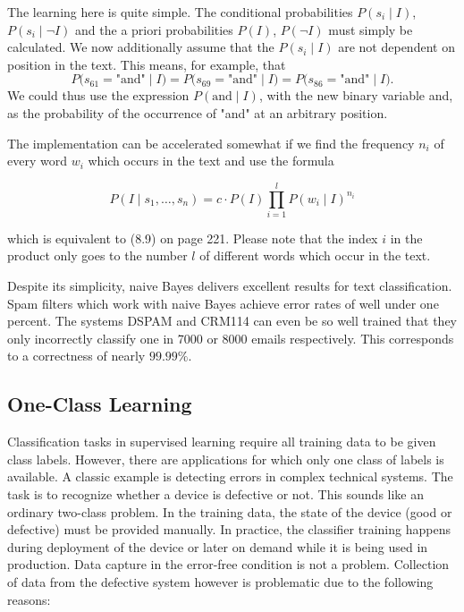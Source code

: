 \documentclass[10pt]{book}
\begin{document}
The learning here is quite simple. The conditional probabilities $P\left(s_{i} \mid I\right)$, $P\left(s_{i} \mid \neg I\right)$ and the a priori probabilities $P(I)$, $P(\neg I)$ must simply be calculated. We now additionally assume that the $P\left(s_{i} \mid I\right)$ are not dependent on position in the text. This means, for example, that
\[
P\bigl(s_{61}=\text{"and"} \mid I\bigr)=P\bigl(s_{69}=\text{"and"} \mid I\bigr)=P\bigl(s_{86}=\text{"and"} \mid I\bigr).
\]
We could thus use the expression $P(\text{and}\mid I)$, with the new binary variable and, as the probability of the occurrence of "and" at an arbitrary position.

The implementation can be accelerated somewhat if we find the frequency $n_{i}$ of every word $w_{i}$ which occurs in the text and use the formula

\begin{equation*}
P\left(I \mid s_{1}, \ldots, s_{n}\right)=c \cdot P(I) \prod_{i=1}^{l} P\left(w_{i} \mid I\right)^{n_{i}} \tag{8.10}
\end{equation*}

which is equivalent to (8.9) on page 221. Please note that the index $i$ in the product only goes to the number $l$ of different words which occur in the text.

Despite its simplicity, naive Bayes delivers excellent results for text classification. Spam filters which work with naive Bayes achieve error rates of well under one percent. The systems DSPAM and CRM114 can even be so well trained that they only incorrectly classify one in 7000 or 8000 emails respectively. This corresponds to a correctness of nearly $99.99 \%$.

\subsection{One-Class Learning}
Classification tasks in supervised learning require all training data to be given class labels. However, there are applications for which only one class of labels is available. A classic example is detecting errors in complex technical systems. The task is to recognize whether a device is defective or not. This sounds like an ordinary two-class problem. In the training data, the state of the device (good or defective) must be provided manually. In practice, the classifier training happens during deployment of the device or later on demand while it is being used in production. Data capture in the error-free condition is not a problem. Collection of data from the defective system however is problematic due to the following reasons:
\end{document}
